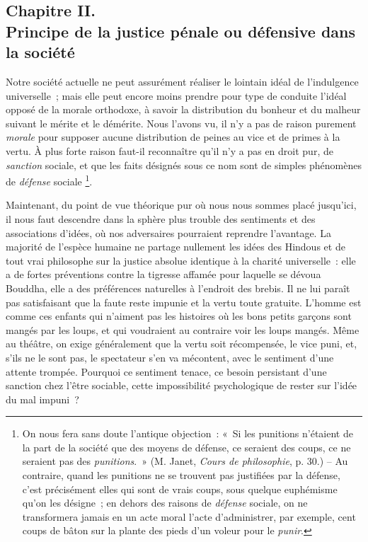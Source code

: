 \documentclass[french,twoside]{book} %
\begin{document}
\subsection[{Chapitre II. Principe de la justice pénale ou défensive dans la société}]{Chapitre II. \\
Principe de la justice pénale ou défensive dans la société}
\noindent Notre société actuelle ne peut assurément réaliser le lointain idéal de l’indulgence universelle ; mais elle peut encore moins prendre pour type de conduite l’idéal opposé de la morale orthodoxe, à savoir la distribution du bonheur et du malheur suivant le mérite et le démérite. Nous l’avons vu, il n’y a pas de raison purement \emph{morale} pour supposer aucune distribution de peines au vice et de primes à la vertu. À plus forte raison faut-il reconnaître qu’il n’y a pas en droit pur, de \emph{sanction} sociale, et que les faits désignés sous ce nom sont de simples phénomènes de \emph{défense} sociale \footnote{On nous fera sans doute l’antique objection : « Si les punitions n’étaient de la part de la société que des moyens de défense, ce seraient des coups, ce ne seraient pas des \emph{punitions}. » (M. Janet, \emph{Cours de philosophie}, p. 30.) – Au contraire, quand les punitions ne se trouvent pas justifiées par la défense, c’est précisément elles qui sont de vrais coups, sous quelque euphémisme qu’on les désigne ; en dehors des raisons de \emph{défense} sociale, on ne transformera jamais en un acte moral l’acte d’administrer, par exemple, cent coups de bâton sur la plante des pieds d’un voleur pour le \emph{punir}.}.\par
Maintenant, du point de vue théorique pur où nous nous sommes placé jusqu’ici, il nous faut descendre dans la sphère plus trouble des sentiments et des associations d’idées, où nos adversaires pourraient reprendre l’avantage. La majorité de l’espèce humaine ne partage nullement les idées des Hindous et de tout vrai philosophe sur la justice absolue identique à la charité universelle : elle a de fortes préventions contre la tigresse affamée pour laquelle se dévoua Bouddha, elle a des préférences naturelles à l’endroit des brebis. Il ne lui paraît pas satisfaisant que la faute reste impunie et la vertu toute gratuite. L’homme est comme ces enfants qui n’aiment pas les histoires où les bons petits garçons sont mangés par les loups, et qui voudraient au contraire voir les loups mangés. Même au théâtre, on exige généralement que la vertu soit récompensée, le vice puni, et, s’ils ne le sont pas, le spectateur s’en va mécontent, avec le sentiment d’une attente trompée. Pourquoi ce sentiment tenace, ce besoin persistant d’une sanction chez l’être sociable, cette impossibilité psychologique de rester sur l’idée du mal impuni ?\par
\end{document}
